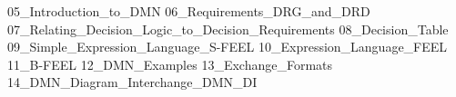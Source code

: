 {05_Introduction_to_DMN}
{06_Requirements_DRG_and_DRD}
{07_Relating_Decision_Logic_to_Decision_Requirements}
{08_Decision_Table}
{09_Simple_Expression_Language_S-FEEL}
{10_Expression_Language_FEEL}
{11_B-FEEL}
{12_DMN_Examples}
{13_Exchange_Formats}
{14_DMN_Diagram_Interchange_DMN_DI}
